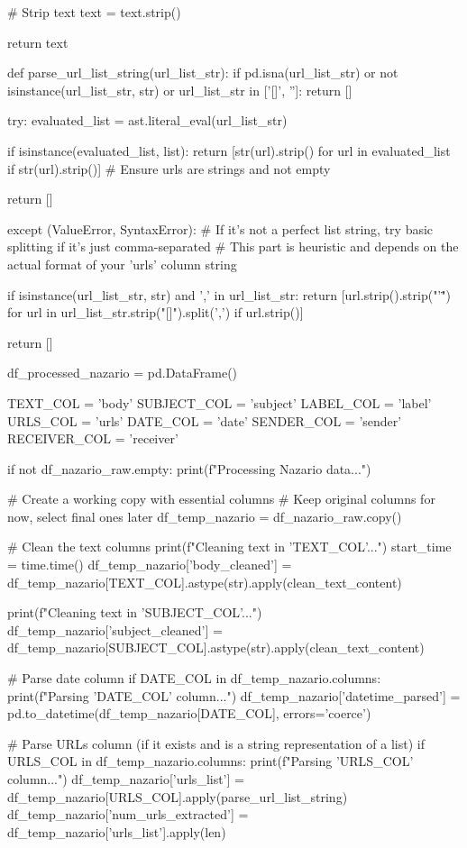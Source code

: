 \begin{ffcode}
# Strip text
text = text.strip()

return text

def parse_url_list_string(url_list_str):
    if pd.isna(url_list_str) or not isinstance(url_list_str, str) or url_list_str in ['[]', '']:
        return []

    try:
        evaluated_list = ast.literal_eval(url_list_str)

        if isinstance(evaluated_list, list):
            return [str(url).strip() for url in evaluated_list if str(url).strip()] # Ensure urls are strings and not empty

        return []

    except (ValueError, SyntaxError):
        # If it's not a perfect list string, try basic splitting if it's just comma-separated
        # This part is heuristic and depends on the actual format of your 'urls' column string

        if isinstance(url_list_str, str) and ',' in url_list_str:
            return [url.strip().strip("'\"") for url in url_list_str.strip("[]").split(',') if url.strip()]

        return []

df_processed_nazario = pd.DataFrame()

TEXT_COL = 'body'
SUBJECT_COL = 'subject'
LABEL_COL = 'label'
URLS_COL = 'urls'
DATE_COL = 'date'
SENDER_COL = 'sender'
RECEIVER_COL = 'receiver'

if not df_nazario_raw.empty:
    print(f"Processing Nazario data...")

    # Create a working copy with essential columns
    # Keep original columns for now, select final ones later
    df_temp_nazario = df_nazario_raw.copy()

    # Clean the text columns
    print(f"Cleaning text in '{TEXT_COL}'...")
    start_time = time.time()
    df_temp_nazario['body_cleaned'] = df_temp_nazario[TEXT_COL].astype(str).apply(clean_text_content)

    print(f"Cleaning text in '{SUBJECT_COL}'...")
    df_temp_nazario['subject_cleaned'] = df_temp_nazario[SUBJECT_COL].astype(str).apply(clean_text_content)

    # Parse date column
    if DATE_COL in df_temp_nazario.columns:
        print(f"Parsing '{DATE_COL}' column...")
        df_temp_nazario['datetime_parsed'] = pd.to_datetime(df_temp_nazario[DATE_COL], errors='coerce')

    # Parse URLs column (if it exists and is a string representation of a list)
    if URLS_COL in df_temp_nazario.columns:
        print(f"Parsing '{URLS_COL}' column...")
        df_temp_nazario['urls_list'] = df_temp_nazario[URLS_COL].apply(parse_url_list_string)
        df_temp_nazario['num_urls_extracted'] = df_temp_nazario['urls_list'].apply(len)


\end{ffcode}
